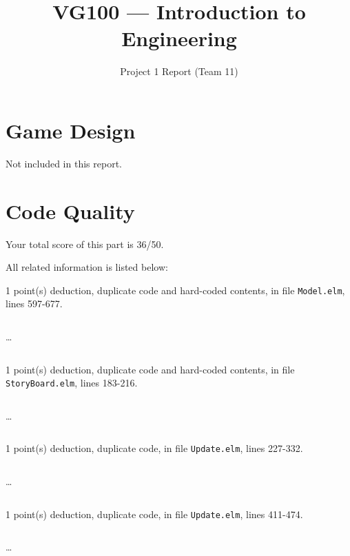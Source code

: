 \documentclass{article}
\title{VG100 --- Introduction to\\ Engineering}
\subtitle{Project 1 Report (Team 11)}
\begin{document}
\maketitle

\section{Game Design}

Not included in this report.

\section{Code Quality}

Your total score of this part is 36/50. \medskip

All related information is listed below: \medskip

1 point(s) {\color{red}deduction}, duplicate code and hard-coded contents, in file {\color{blue}\texttt{Model.elm}}, lines {\color{blue}597-677}.

\inputminted[firstline=597,lastline=606]{elm}{Model.elm}

\dots

\inputminted[firstline=668,lastline=677]{elm}{Model.elm}

1 point(s) {\color{red}deduction}, duplicate code and hard-coded contents, in file {\color{blue}\texttt{StoryBoard.elm}}, lines {\color{blue}183-216}.

\inputminted[firstline=183,lastline=192]{elm}{StoryBoard.elm}

\dots

\inputminted[firstline=207,lastline=216]{elm}{StoryBoard.elm}

1 point(s) {\color{red}deduction}, duplicate code, in file {\color{blue}\texttt{Update.elm}}, lines {\color{blue}227-332}.

\inputminted[firstline=227,lastline=236]{elm}{Update.elm}

\dots

\inputminted[firstline=323,lastline=332]{elm}{Update.elm}

1 point(s) {\color{red}deduction}, duplicate code, in file {\color{blue}\texttt{Update.elm}}, lines {\color{blue}411-474}.

\inputminted[firstline=411,lastline=420]{elm}{Update.elm}

\dots

\inputminted[firstline=465,lastline=474]{elm}{Update.elm}
\end{document}
